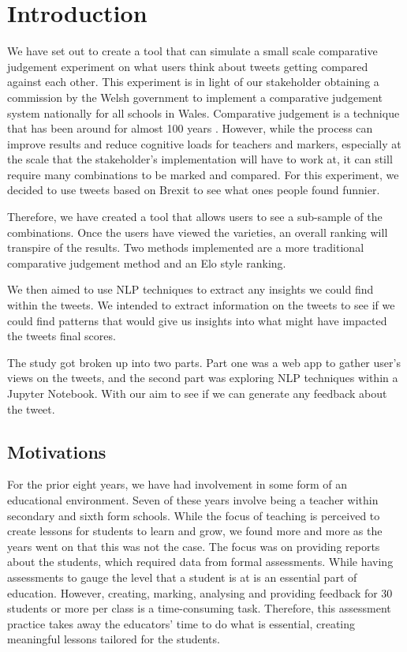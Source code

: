 \chapter{Introduction}
	\label{chap:intro}
	We have set out to create a tool that can simulate a small scale comparative judgement experiment on what users think about tweets getting compared against each other. This experiment is in light of our stakeholder obtaining a commission by the Welsh government to implement a comparative judgement system nationally for all schools in Wales. Comparative judgement is a technique that has been around for almost 100 years \cite{thurstone1927law}. However, while the process can improve results and reduce cognitive loads for teachers and markers, especially at the scale that the stakeholder's implementation will have to work at, it can still require many combinations to be marked and compared. For this experiment, we decided to use tweets based on Brexit to see what ones people found funnier.
	
	Therefore, we have created a tool that allows users to see a sub-sample of the combinations. Once the users have viewed the varieties, an overall ranking will transpire of the results. Two methods implemented are a more traditional comparative judgement method and an Elo style ranking.
	
	We then aimed to use NLP techniques to extract any insights we could find within the tweets. We intended to extract information on the tweets to see if we could find patterns that would give us insights into what might have impacted the tweets final scores.
	
	The study got broken up into two parts. Part one was a web app to gather user's views on the tweets, and the second part was exploring NLP techniques within a Jupyter Notebook. With our aim to see if we can generate any feedback about the tweet.


	\section{Motivations}
		\label{sec:intro_motivation} 
	For the prior eight years, we have had involvement in some form of an educational environment. Seven of these years involve being a teacher within secondary and sixth form schools. While the focus of teaching is perceived to create lessons for students to learn and grow, we found more and more as the years went on that this was not the case. The focus was on providing reports about the students, which required data from formal assessments. While having assessments to gauge the level that a student is at is an essential part of education. However, creating, marking, analysing and providing feedback for 30 students or more per class is a time-consuming task. Therefore, this assessment practice takes away the educators' time to do what is essential, creating meaningful lessons tailored for the students.
	
